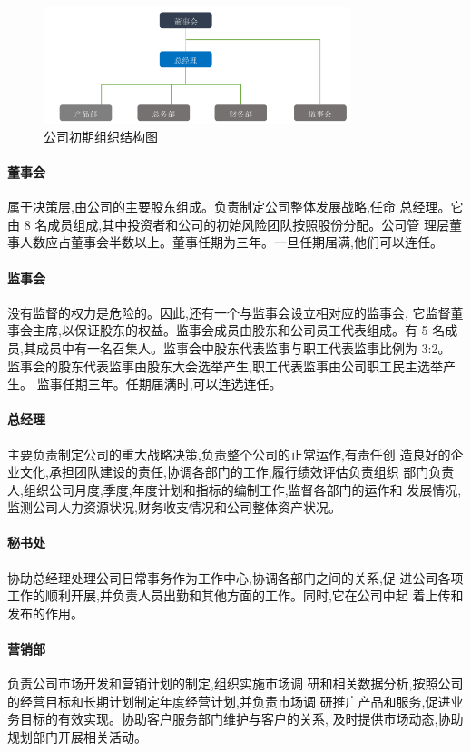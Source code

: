 \begin{figure}[htbp]
\centering
\label{fig:early-struct}
\includegraphics[width=0.8\textwidth]{../images/company/早期结构}
\caption{公司初期组织结构图}
\end{figure}

\paragraph{董事会}
属于决策层,由公司的主要股东组成。负责制定公司整体发展战略,任命
总经理。它由 8 名成员组成,其中投资者和公司的初始风险团队按照股份分配。公司管
理层董事人数应占董事会半数以上。董事任期为三年。一旦任期届满,他们可以连任。
\paragraph{ 监事会 }
没有监督的权力是危险的。因此,还有一个与监事会设立相对应的监事会,
它监督董事会主席,以保证股东的权益。监事会成员由股东和公司员工代表组成。有 5
名成员,其成员中有一名召集人。监事会中股东代表监事与职工代表监事比例为 3:2。
监事会的股东代表监事由股东大会选举产生,职工代表监事由公司职工民主选举产生。
监事任期三年。任期届满时,可以连选连任。
\paragraph{ 总经理 }
主要负责制定公司的重大战略决策,负责整个公司的正常运作,有责任创
造良好的企业文化,承担团队建设的责任,协调各部门的工作,履行绩效评估负责组织
部门负责人,组织公司月度,季度,年度计划和指标的编制工作,监督各部门的运作和
发展情况,监测公司人力资源状况,财务收支情况和公司整体资产状况。
\paragraph{秘书处}
协助总经理处理公司日常事务作为工作中心,协调各部门之间的关系,促
进公司各项工作的顺利开展,并负责人员出勤和其他方面的工作。同时,它在公司中起
着上传和发布的作用。

\paragraph{营销部}
负责公司市场开发和营销计划的制定,组织实施市场调
研和相关数据分析,按照公司的经营目标和长期计划制定年度经营计划,并负责市场调
研推广产品和服务,促进业务目标的有效实现。协助客户服务部门维护与客户的关系,
及时提供市场动态,协助规划部门开展相关活动。
